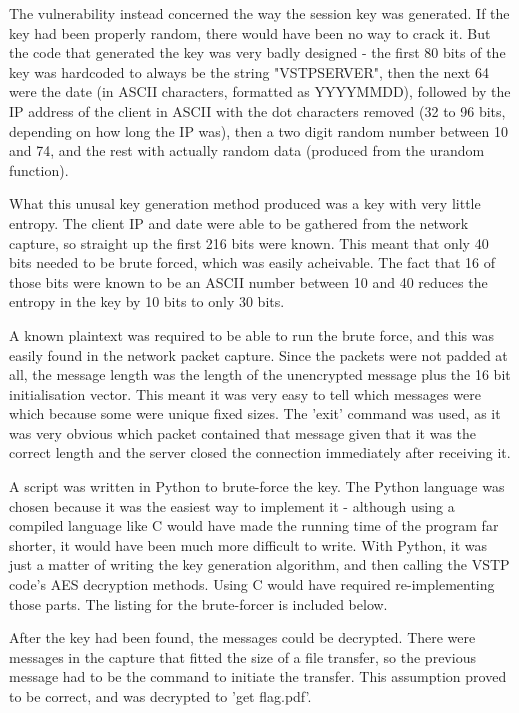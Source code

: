 The vulnerability instead concerned the way the session key was generated. If
the key had been properly random, there would have been no way to crack it. But
the code that generated the key was very badly designed - the first 80 bits of
the key was hardcoded to always be the string "VSTPSERVER", then the next 64
were the date (in ASCII characters, formatted as YYYYMMDD), followed by the IP
address of the client in ASCII with the dot characters removed (32 to 96 bits,
depending on how long the IP was), then a two digit random number between 10
and 74, and the rest with actually random data (produced from the urandom 
function).

What this unusal key generation method produced was a key with very little
entropy. The client IP and date were able to be gathered from the network
capture, so straight up the first 216 bits were known. This meant that
only 40 bits needed to be brute forced, which was easily acheivable. The
fact that 16 of those bits were known to be an ASCII number between 10
and 40 reduces the entropy in the key by 10 bits to only 30 bits.

A known plaintext was required to be able to run the brute force, and this
was easily found in the network packet capture. Since the packets were not
padded at all, the message length was the length of the unencrypted message
plus the 16 bit initialisation vector. This meant it was very easy to tell
which messages were which because some were unique fixed sizes. The 'exit'
command was used, as it was very obvious which packet contained that message
given that it was the correct length and the server closed the connection
immediately after receiving it.

A script was written in Python to brute-force the key. The Python language
was chosen because it was the easiest way to implement it - although using a
compiled language like C would have made the running time of the program far
shorter, it would have been much more difficult to write. With Python, it was
just a matter of writing the key generation algorithm, and then calling the
VSTP code's AES decryption methods. Using C would have required 
re-implementing those parts. The listing for the brute-forcer is included
below.

After the key had been found, the messages could be decrypted. There were
messages in the capture that fitted the size of a file transfer, so the
previous message had to be the command to initiate the transfer. This
assumption proved to be correct, and was decrypted to 'get flag.pdf'.

